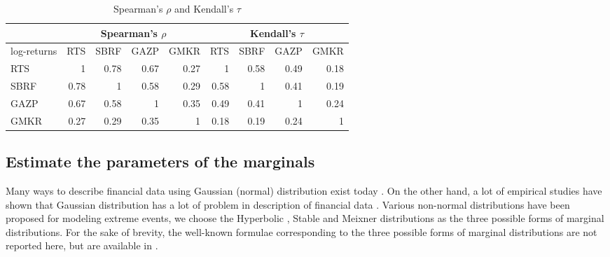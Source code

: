 \documentclass{llncs}
\begin{document}
\begin{table}%
\centering
\caption{Spearman's $\rho$ and Kendall's $\tau$}
\label{Cor1}
\setlength{\tabcolsep}{4pt}
\begin{tabular}{l|rrrr|rrrr}
\hline
\multicolumn{1}{c}{} & \multicolumn{4}{c}{Spearman’s $\rho$} & \multicolumn{4}{c}{Kendall’s $\tau$} \\ \hline
log-returns & \multicolumn{1}{c}{RTS} & \multicolumn{1}{c}{SBRF} & \multicolumn{1}{c}{GAZP} & \multicolumn{1}{c|}{GMKR} & \multicolumn{1}{c}{RTS} & \multicolumn{1}{c}{SBRF} & \multicolumn{1}{c}{GAZP} & \multicolumn{1}{c}{GMKR} \\ \hline
RTS  & 1 & 0.78 & 0.67 & 0.27 & 1 & 0.58 & 0.49 & 0.18 \bigstrut[t] \\
SBRF & 0.78 & 1 & 0.58 & 0.29 & 0.58 & 1 & 0.41 & 0.19 \\
GAZP & 0.67 & 0.58 & 1 & 0.35 & 0.49 & 0.41 & 1 & 0.24 \\
GMKR & 0.27 & 0.29 & 0.35 & 1 & 0.18 & 0.19 & 0.24 & 1 \bigstrut[b] \\ \hline
\end{tabular}
\end{table}

\subsection{Estimate the parameters of the marginals} 
%
Many ways to describe financial data using Gaussian (normal) distribution exist today \cite{Json1949}. On the other hand, a lot of empirical studies have shown that Gaussian distribution has a lot of problem in description of financial data \cite{Rachev2005, Limp2011, Wilmott2007}. Various non-normal distributions have been proposed for modeling extreme events, we choose the Hyperbolic \cite{Barndoff1983}, Stable \cite{Nolan2009, Rachev2005, Stoyanov2013} and Meixner \cite{Schoutens2002} distributions as the three possible forms of marginal distributions.
%
For the sake of brevity, the well-known formulae corresponding to the three possible forms of marginal distributions
are not reported here, but are available in \cite{Barndoff1983, Nolan2009, Rachev2005, Stoyanov2013, Schoutens2002}.
\end{document}
